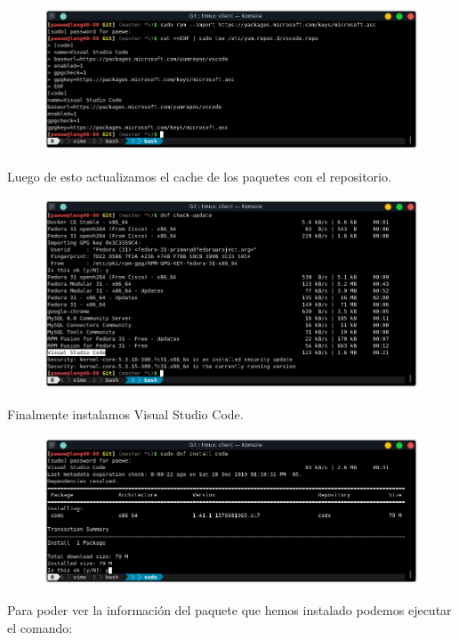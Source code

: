 \documentclass{article}
\begin{document}
\begin{figure}[h!]
  \centering
  \includegraphics[scale=0.75]{./Pictures/045_vscode_repo.png}
\end{figure}

Luego de esto actualizamos el cache de los paquetes con el repositorio.

\begin{figure}[h!]
  \centering
  \includegraphics[scale=0.75]{./Pictures/046_repositorio_updated.png}
\end{figure}

Finalmente instalamos Visual Studio Code.

\begin{figure}[h!]
  \centering
  \includegraphics[scale=0.75]{./Pictures/047_install_vscode_y.png}
\end{figure}

Para poder ver la información del paquete que hemos instalado podemos ejecutar
el comando:
\end{document}
